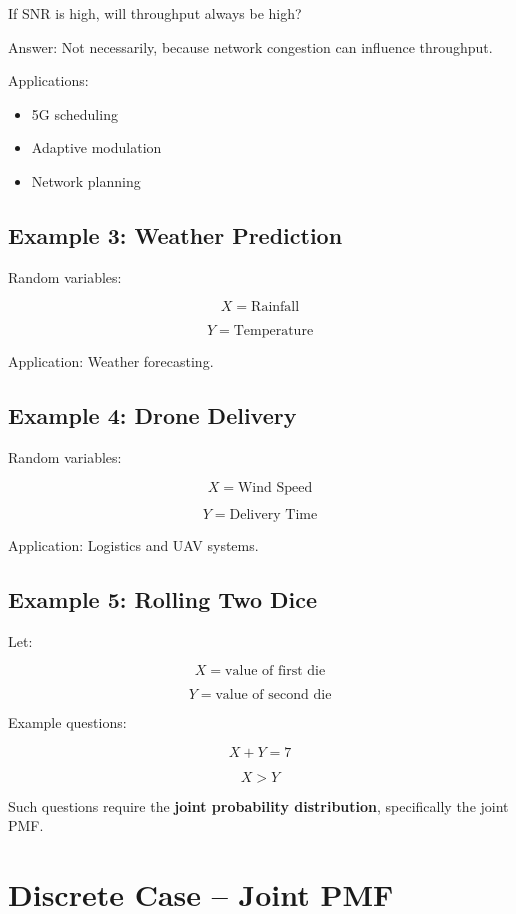 \documentclass[12pt]{article}
\begin{document}
If SNR is high, will throughput always be high?

Answer: Not necessarily, because network congestion can influence throughput.

Applications:

\begin{itemize}
\item 5G scheduling
\item Adaptive modulation
\item Network planning
\end{itemize}

\subsection{Example 3: Weather Prediction}

Random variables:

\[
X = \text{Rainfall}
\]

\[
Y = \text{Temperature}
\]

Application: Weather forecasting.

\subsection{Example 4: Drone Delivery}

Random variables:

\[
X = \text{Wind Speed}
\]

\[
Y = \text{Delivery Time}
\]

Application: Logistics and UAV systems.

\subsection{Example 5: Rolling Two Dice}

Let:

\[
X = \text{value of first die}
\]

\[
Y = \text{value of second die}
\]

Example questions:

\[
X + Y = 7
\]

\[
X > Y
\]

Such questions require the \textbf{joint probability distribution}, specifically the joint PMF.

\section{Discrete Case -- Joint PMF}
\end{document}
